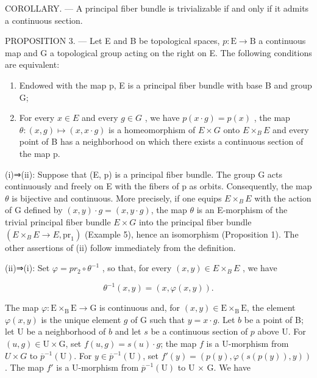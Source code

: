 COROLLARY. --- A principal fiber bundle is trivializable if and only if it admits a continuous section.

PROPOSITION 3. --- Let E and B be topological spaces, \(p\colon\mathrm{E}\to\mathrm{B}\) a continuous map and G a topological group acting on the right on E. The following conditions are equivalent:

\begin{enumerate}
\def\labelenumi{(\roman{enumi})}
\item
  Endowed with the map p, E is a principal fiber bundle with base B and group G;
\item
  For every \(x \in E\) and every \(g \in G\) , we have \(p(x \cdot g) = p(x)\) , the map \(\theta: (x, g) \mapsto (x, x \cdot g)\) is a homeomorphism of \(E \times G\) onto \(E \times_{B} E\) and every point of B has a neighborhood on which there exists a continuous section of the map p.
\end{enumerate}

(i)⇒(ii): Suppose that (E, p) is a principal fiber bundle. The group G acts continuously and freely on E with the fibers of p as orbits. Consequently, the map \(\theta\) is bijective and continuous. More precisely, if one equips \(E \times_{B} E\) with the action of G defined by \((x, y) \cdot g = (x, y \cdot g)\), the map \(\theta\) is an E-morphism of the trivial principal fiber bundle \(E \times G\) into the principal fiber bundle \((E \times_{B} E \to E, \mathrm{pr}_{1})\) (Example 5), hence an isomorphism (Proposition 1). The other assertions of (ii) follow immediately from the definition.

(ii)⇒(i): Set \(\varphi = pr_{2} \circ \theta^{-1}\) , so that, for every \((x, y) \in E \times_{B} E\) , we have

\[
\theta^ {- 1} (x, y) = (x, \varphi (x, y)).\tag{1}
\]

The map \(\varphi\colon\mathrm{E}\times_{\mathrm{B}}\mathrm{E}\to\mathrm{G}\) is continuous and, for \((x,y)\in\mathrm{E}\times_{\mathrm{B}}\mathrm{E}\), the element \(\varphi(x,y)\) is the unique element \(g\) of G such that \(y=x\cdot g\). Let \(b\) be a point of B; let U be a neighborhood of \(b\) and let \(s\) be a continuous section of \(p\) above U. For \((u,g)\in\mathrm{U}\times\mathrm{G}\), set \(f(u,g)=s(u)\cdot g\); the map \(f\) is a U-morphism from \(U \times G\) to \(\overline{p}^{-1}(\mathrm{U})\). For \(y\in\overline{p}^{-1}(\mathrm{U})\), set \(f'(y)=(p(y),\varphi(s(p(y)),y))\). The map \(f'\) is a U-morphism from \(\overline{p}^{-1}(\mathrm{U})\) to U \(\times\) G. We have

